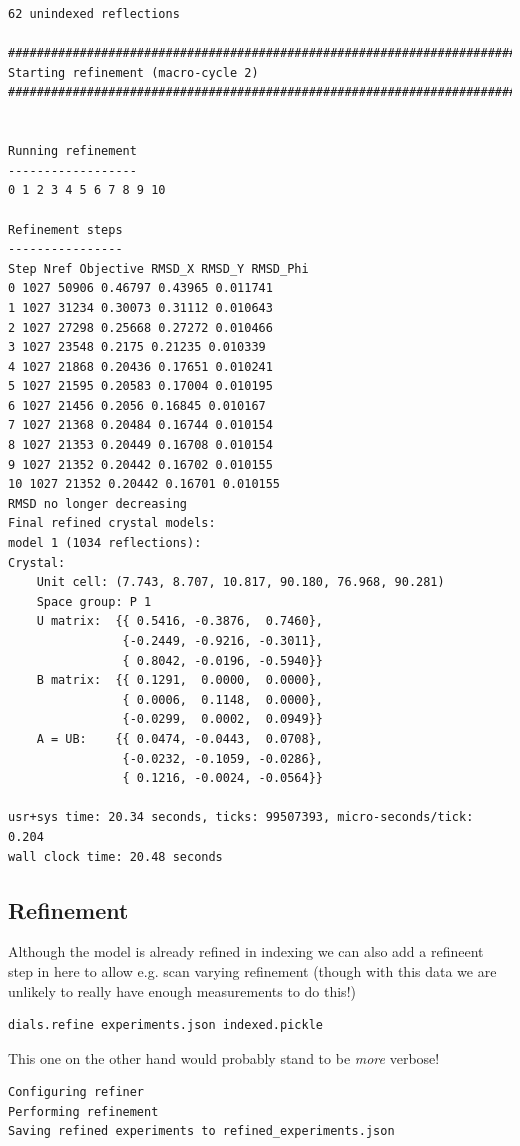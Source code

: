 \documentclass[a4paper, 11pt]{article}
\begin{document}
{\begin{verbatim}
62 unindexed reflections

################################################################################
Starting refinement (macro-cycle 2)
################################################################################


Running refinement
------------------
0 1 2 3 4 5 6 7 8 9 10

Refinement steps
----------------
Step Nref Objective RMSD_X RMSD_Y RMSD_Phi
0 1027 50906 0.46797 0.43965 0.011741 
1 1027 31234 0.30073 0.31112 0.010643 
2 1027 27298 0.25668 0.27272 0.010466 
3 1027 23548 0.2175 0.21235 0.010339 
4 1027 21868 0.20436 0.17651 0.010241 
5 1027 21595 0.20583 0.17004 0.010195 
6 1027 21456 0.2056 0.16845 0.010167 
7 1027 21368 0.20484 0.16744 0.010154 
8 1027 21353 0.20449 0.16708 0.010154 
9 1027 21352 0.20442 0.16702 0.010155 
10 1027 21352 0.20442 0.16701 0.010155 
RMSD no longer decreasing
Final refined crystal models:
model 1 (1034 reflections):
Crystal:
    Unit cell: (7.743, 8.707, 10.817, 90.180, 76.968, 90.281)
    Space group: P 1
    U matrix:  {{ 0.5416, -0.3876,  0.7460},
                {-0.2449, -0.9216, -0.3011},
                { 0.8042, -0.0196, -0.5940}}
    B matrix:  {{ 0.1291,  0.0000,  0.0000},
                { 0.0006,  0.1148,  0.0000},
                {-0.0299,  0.0002,  0.0949}}
    A = UB:    {{ 0.0474, -0.0443,  0.0708},
                {-0.0232, -0.1059, -0.0286},
                { 0.1216, -0.0024, -0.0564}}

usr+sys time: 20.34 seconds, ticks: 99507393, micro-seconds/tick: 0.204
wall clock time: 20.48 seconds
\end{verbatim}
}

\subsection{Refinement}

Although the model is already refined in indexing we can also add a
refineent step in here to allow e.g. scan varying refinement (though
with this data we are unlikely to really have enough measurements to
do this!)

{\small
\begin{verbatim}
dials.refine experiments.json indexed.pickle
\end{verbatim}
}

\noindent
This one on the other hand would probably stand to be \emph{more} verbose!

{\small
\begin{verbatim}
Configuring refiner
Performing refinement
Saving refined experiments to refined_experiments.json
\end{verbatim}
}
\end{document}
